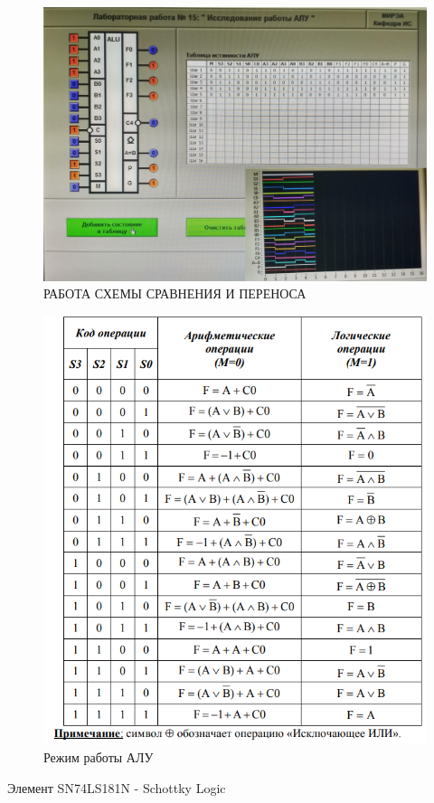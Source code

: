 \begin{figure}[H]
	\centering
	\includegraphics[width=0.95\linewidth]{imgs/15/3}
	\caption{РАБОТА СХЕМЫ СРАВНЕНИЯ И ПЕРЕНОСА}
	\label{fig:15_3}
\end{figure}

\begin{figure}[H]
	\centering
	\includegraphics[width=0.85\linewidth]{imgs/15/15_tab}
	\caption{Режим работы АЛУ}
	\label{fig:15_tab}
\end{figure}

Элемент SN74LS181N - Schottky Logic

